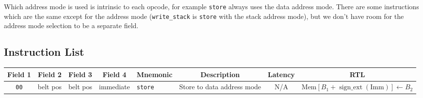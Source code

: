 \documentclass{article}
\begin{document}
	Which address mode is used is intrinsic to each opcode, for example \texttt{store} always uses the data address mode.
	There are some instructions which are the same except for the address mode (\texttt{write\_stack} is \texttt{store} with the stack address mode), but we don't have room for the address mode selection to be a separate field.

\clearpage
\begin{landscape}
\section{Instruction List}

	\begin{longtable}{c c c c l l c l}
		\multicolumn{1}{c}{Field 1} &
		\multicolumn{1}{c}{Field 2} &
		\multicolumn{1}{c}{Field 3} &
		\multicolumn{1}{c}{Field 4} &
		\multicolumn{1}{c}{Mnemonic} &
		\multicolumn{1}{c}{Description} &
		\multicolumn{1}{c}{Latency} &
		\multicolumn{1}{c}{RTL} \\
		\midrule
		\texttt{00} & belt pos & belt pos & immediate & \texttt{store} & Store to data address mode & N/A &
			\(\textrm{Mem}\left[B_1 + \operatorname{sign\_ext}\left(\textrm{Imm}\right)\right] \gets B_2\) \\


\end{longtable}
\end{landscape}
\end{document}
